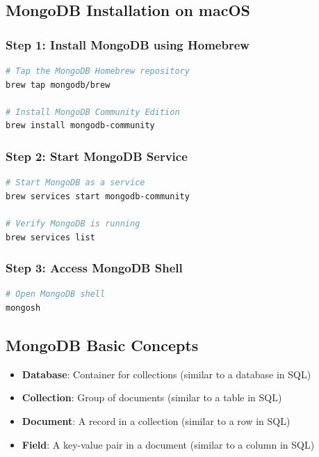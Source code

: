 \documentclass[12pt,a4paper]{article}
\begin{document}
\subsection{MongoDB Installation on macOS}

\subsubsection{Step 1: Install MongoDB using Homebrew}

\begin{lstlisting}[language=bash]
# Tap the MongoDB Homebrew repository
brew tap mongodb/brew

# Install MongoDB Community Edition
brew install mongodb-community
\end{lstlisting}

\subsubsection{Step 2: Start MongoDB Service}

\begin{lstlisting}[language=bash]
# Start MongoDB as a service
brew services start mongodb-community

# Verify MongoDB is running
brew services list
\end{lstlisting}

\subsubsection{Step 3: Access MongoDB Shell}

\begin{lstlisting}[language=bash]
# Open MongoDB shell
mongosh
\end{lstlisting}

\subsection{MongoDB Basic Concepts}

\begin{itemize}
    \item \textbf{Database}: Container for collections (similar to a database in SQL)
    \item \textbf{Collection}: Group of documents (similar to a table in SQL)
    \item \textbf{Document}: A record in a collection (similar to a row in SQL)
    \item \textbf{Field}: A key-value pair in a document (similar to a column in SQL)
\end{itemize}
\end{document}
